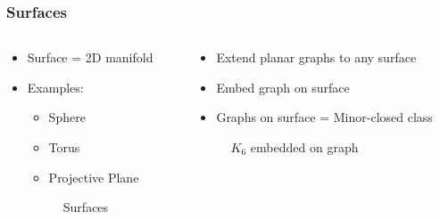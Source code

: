 \documentclass[english]{beamer}
\begin{document}
\begin{frame}
  \frametitle{Surfaces}
  \begin{columns}
    \begin{column}{0.5\textwidth}
      \begin{itemize}
        \item Surface = 2D manifold
        \item Examples: \begin{itemize}
                \item Sphere
                \item Torus
                \item Projective Plane
              \end{itemize}
              \begin{figure}
                \centering
                
                \caption{Surfaces}
              \end{figure}
      \end{itemize}
    \end{column}
    \pause
    \begin{column}{0.5 \textwidth}
      \begin{itemize}
        \item Extend planar graphs to any surface
        \item Embed graph on surface
        \item Graphs on surface = Minor-closed class
      \end{itemize}
      \begin{figure}
        \centering
        
        \caption{$K_6$ embedded on graph}
      \end{figure}
    \end{column}
  \end{columns}
\end{frame}
\end{document}
